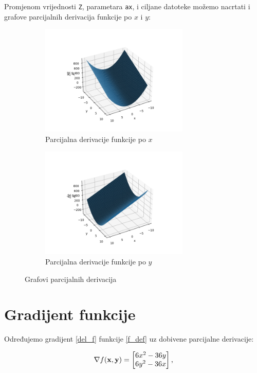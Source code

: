 Promjenom vrijednosti \verb|Z|, parametara \verb|ax|, i ciljane datoteke možemo nacrtati i grafove parcijalnih derivacija funkcije po $x$ i $y$:
\begin{figure}[H]
    \begin{subfigure}{0.5\linewidth}
        \includegraphics[width=200pt]{figures/graf_fdx.png}
        \caption{Parcijalna derivacije funkcije po $x$}
    \end{subfigure}%
    \begin{subfigure}{0.5\linewidth}
        \includegraphics[width=200pt]{figures/graf_fdy.png}
        \caption{Parcijalna derivacije funkcije po $y$}
    \end{subfigure}
    \caption{Grafovi parcijalnih derivacija}
\end{figure}

\newpage
\section{Gradijent funkcije}

Određujemo gradijent \eqref{del_f} funkcije \eqref{f_def} uz dobivene parcijalne derivacije:

\begin{equation}
    \label{del_f_value}
    \nabla f(\mathbf{x}, \mathbf{y}) = \begin{bmatrix}
        6x^2 - 36y \\
        6y^2 - 36x
    \end{bmatrix}\textnormal{,}
\end{equation}

